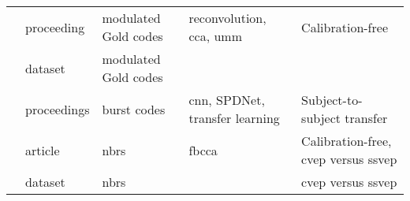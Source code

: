 \documentclass[a4paper,landscape]{article}
\begin{document}
\begin{table}[H]
\begin{tabular}{p{5cm}p{2cm}p{5cm}p{5cm}p{6.5cm}}
		\citeauthor{thielen2024} & proceeding & modulated Gold codes & reconvolution, \acrshort{cca}, \acrshort{umm} & Calibration-free \\
		\citeauthor{thielen2024dataset} & dataset & modulated Gold codes & & \\
		\citeauthor{velut2024} & proceedings & burst codes & \acrshort{cnn}, SPDNet, transfer learning & Subject-to-subject transfer \\
		\citeauthor{zheng2024a} & article & \acrshort{nbrs} & \acrshort{fbcca} & Calibration-free, \acrshort{cvep} versus \acrshort{ssvep} \\
		\citeauthor{zheng2024b} & dataset & \acrshort{nbrs} & & \acrshort{cvep} versus \acrshort{ssvep} \\
		\bottomrule
	\end{tabular}
\end{table}
\end{document}

